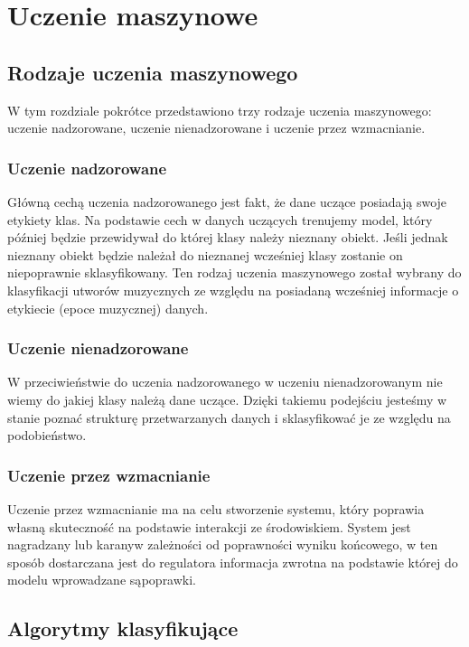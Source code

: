\documentclass[printmode, eng, openany]{mgr}
\newcommand\tab[1][1cm]{\hspace*{#1}}
\begin{document}
\chapter{Uczenie maszynowe}
\section{Rodzaje uczenia maszynowego}
\tab W tym rozdziale pokrótce przedstawiono trzy rodzaje uczenia maszynowego: uczenie nadzorowane, uczenie nienadzorowane i uczenie przez wzmacnianie.
\subsection{Uczenie nadzorowane}
\tab Główną cechą uczenia nadzorowanego jest fakt, że dane uczące posiadają swoje etykiety klas. Na podstawie cech w danych uczących trenujemy model, który później będzie przewidywał do której klasy należy nieznany obiekt. Jeśli jednak nieznany obiekt będzie należał do nieznanej wcześniej klasy zostanie on niepoprawnie sklasyfikowany.
\tab Ten rodzaj uczenia maszynowego został wybrany do klasyfikacji utworów muzycznych ze względu na posiadaną wcześniej informacje o etykiecie (epoce muzycznej) danych.
\subsection{Uczenie nienadzorowane}
\tab W przeciwieństwie do uczenia nadzorowanego w uczeniu nienadzorowanym nie wiemy do jakiej klasy należą dane uczące. Dzięki takiemu podejściu jesteśmy w stanie poznać strukturę przetwarzanych danych i sklasyfikować je ze względu na podobieństwo. 
\subsection{Uczenie przez wzmacnianie}
\tab Uczenie przez wzmacnianie ma na celu stworzenie systemu, który poprawia własną skuteczność na podstawie interakcji ze środowiskiem. System jest nagradzany lub karany\linebreak w zależności od poprawności wyniku końcowego, w ten sposób dostarczana jest do regulatora informacja zwrotna na podstawie której do modelu wprowadzane są\linebreak poprawki.
\section{Algorytmy klasyfikujące}
\end{document}
